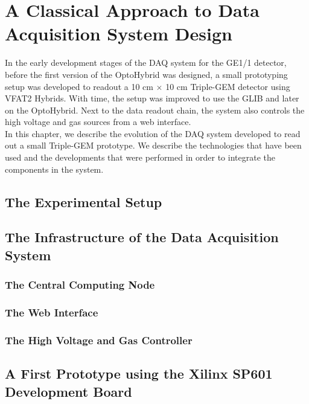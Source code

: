 \chapter{A Classical Approach to Data Acquisition System Design}
\label{chap:III-1-arch}

  In the early development stages of the DAQ system for the GE1/1 detector, before the first version of the OptoHybrid was designed, a small prototyping setup was developed to readout a 10 cm $ \times $ 10 cm Triple-GEM detector using VFAT2 Hybrids. With time, the setup was improved to use the GLIB and later on the OptoHybrid. Next to the data readout chain, the system also controls the high voltage and gas sources from a web interface. \\

  In this chapter, we describe the evolution of the DAQ system developed to read out a small Triple-GEM prototype. We describe the technologies that have been used and the developments that were performed in order to integrate the components in the system.

  \section{The Experimental Setup}

  \section{The Infrastructure of the Data Acquisition System}

    \subsection{The Central Computing Node}

    \subsection{The Web Interface}

    \subsection{The High Voltage and Gas Controller}

  \section{A First Prototype using the Xilinx SP601 Development Board}

